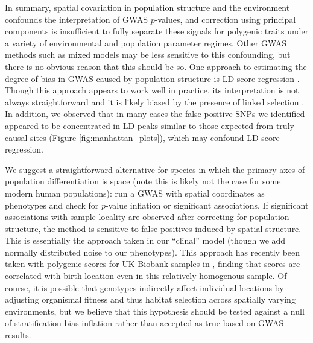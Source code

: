 \documentclass[10pt,twoside,lineno,hidelinks]{preprint}
\begin{document}
In summary, spatial covariation in population structure and the environment confounds the interpretation of GWAS $p$-values, and correction using principal components is insufficient to fully separate these signals for polygenic traits under a variety of environmental and population parameter regimes. 
Other GWAS methods such as mixed models \citep{Kang2008}  may be less sensitive to this confounding, but there is no obvious reason that this should be so. 
One approach to estimating the degree of bias in GWAS caused by population structure is LD score regression \citep{Bulik-Sullivan2015}. 
Though this approach appears to work well in practice, its interpretation is not always straightforward and it is likely biased by the presence of linked selection \citep{Berg2018}. In addition, we observed that in many cases the false-positive SNPs we identified appeared to be concentrated in LD peaks similar to those expected from truly causal sites (Figure \ref{fig:manhattan_plots}), which may confound LD score regression.

We suggest a straightforward alternative for species in which the primary axes of population differentiation is space 
(note this is likely not the case for some modern human populations): 
run a GWAS with spatial coordinates as phenotypes and check for $p$-value inflation or significant associations.
If significant associations with sample locality are observed after correcting for population structure, 
the method is sensitive to false positives induced by spatial structure. This is essentially the approach taken in our ``clinal'' model (though we add normally distributed noise to our phenotypes). This approach has recently been taken with polygenic scores for UK Biobank samples in \citet{haworth2019apparent}, finding that scores are correlated with birth location even in this relatively homogenous sample. 
Of course, it is possible that genotypes indirectly affect individual locations by adjusting organismal fitness and thus habitat selection across spatially varying environments, but we believe that this hypothesis should be tested against a null of stratification bias inflation rather than accepted as true based on GWAS results.  

\end{document}
